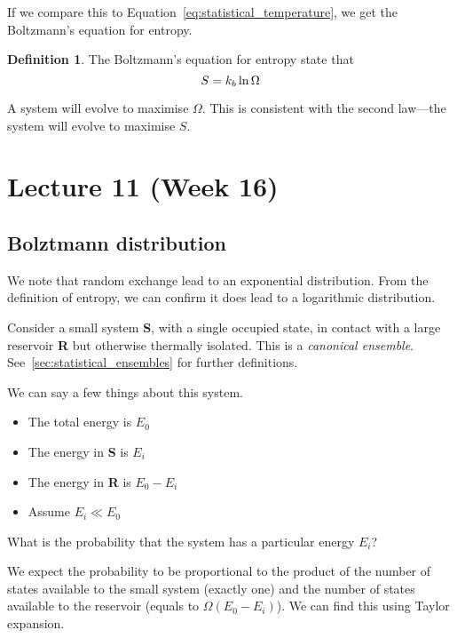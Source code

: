 \documentclass[12pt,chapterprefix=false,dvipsnames]{scrbook}
\theoremstyle{dotless}
\theoremstyle{definition}
\newtheorem{protodefinition}{Definition}[section]
\newenvironment{definition}
{\colorlet{shadecolor}{black!15}\begin{shaded}\begin{protodefinition}}
			{\end{protodefinition}\end{shaded}}
\begin{document}
If we compare this to Equation~\ref{eq:statistical_temperature}, we get
the Boltzmann's equation for entropy.

\begin{definition}
	The Boltzmann's equation for entropy state that
	\begin{equation}
		\label{eq:boltzmann_entropy}
		S = k_b \naturallogarithm{\Omega}
	\end{equation}

	A system will evolve to maximise $\Omega$. This
	is consistent with the second law---the system will evolve to
	maximise $S$.
\end{definition}

\chapter{Lecture 11 (Week 16)}%
\label{cha:lecture_11}

\section{Bolztmann distribution}%
\label{sec:bolztmann_distribution}

We note that random exchange lead to an exponential
distribution. From the definition of entropy, we can confirm it
does lead to a logarithmic distribution.

Consider a small system \textbf{S}, with a single
occupied state, in contact with a large reservoir
\textbf{R}  but otherwise thermally isolated. This
is a \textit{canonical ensemble}. See~\ref{sec:statistical_ensembles} for
further definitions.

We can say a few things about this system.
\begin{itemize}
	\item The total energy is $E_0$
	\item The energy in \textbf{S} is $E_i$
	\item The energy in \textbf{R} is $E_0 - E_i$
	\item Assume $E_i \ll E_0$
\end{itemize}

What is the probability that the system has a particular energy
$E_i$?

We expect the probability to be proportional to the product of
the number of states available to the small system (exactly one)
and the number of states available to the reservoir (equals to
$\Omega\left(E_0 - E_i\right)$). We can find this using Taylor
expansion.
\end{document}
